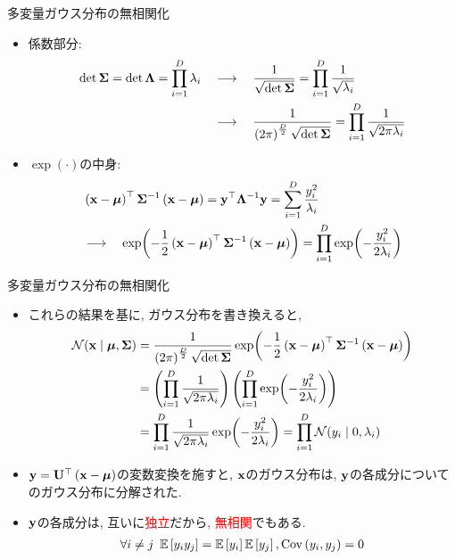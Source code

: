 \documentclass[dvipdfmx,notheorems,t]{beamer}
\begin{document}
\begin{frame}{多変量ガウス分布の無相関化}
\begin{itemize}
  \item 係数部分:
  \begin{align*}
    \det \vb{\Sigma} = \det \vb{\Lambda} = \prod_{i = 1}^D \lambda_i \quad &\longrightarrow \quad
      \frac{1}{\sqrt{\det \vb{\Sigma}}} = \prod_{i = 1}^D \frac{1}{\sqrt{\lambda_i}} \\
      &\longrightarrow \quad
      \frac{1}{\left( 2\pi \right)^\frac{D}{2} \sqrt{\det \vb{\Sigma}}}
      = \prod_{i = 1}^D \frac{1}{\sqrt{2\pi \lambda_i}}
  \end{align*}
  \item $\exp(\cdot)$の中身:
  \begin{align*}
    & \left( \vb{x} - \vb*{\mu} \right)^\top \vb{\Sigma}^{-1}
      \left( \vb{x} - \vb*{\mu} \right)
      = \vb{y}^\top \vb{\Lambda}^{-1} \vb{y}
      = \sum_{i = 1}^D \frac{y_i^2}{\lambda_i} \\
    & \longrightarrow \quad
    \exp(-\frac{1}{2} \left( \vb{x} - \vb*{\mu} \right)^\top \vb{\Sigma}^{-1}
      \left( \vb{x} - \vb*{\mu} \right))
      = \prod_{i = 1}^D \exp(-\frac{y_i^2}{2 \lambda_i})
  \end{align*}
\end{itemize}
\end{frame}

\begin{frame}{多変量ガウス分布の無相関化}
\begin{itemize}
  \item これらの結果を基に, ガウス分布を書き換えると,
  \begin{align*}
    \mathcal{N}(\vb{x} \mid \vb*{\mu}, \vb{\Sigma})
      &= \frac{1}{\left( 2\pi \right)^\frac{D}{2} \sqrt{\det \vb{\Sigma}}}
        \exp(-\frac{1}{2} \left( \vb{x} - \vb*{\mu} \right)^\top \vb{\Sigma}^{-1}
        \left( \vb{x} - \vb*{\mu} \right)) \\
      &= \left( \prod_{i = 1}^D \frac{1}{\sqrt{2\pi \lambda_i}} \right)
        \left( \prod_{i = 1}^D \exp(-\frac{y_i^2}{2 \lambda_i}) \right) \\
      &= \prod_{i = 1}^D \frac{1}{\sqrt{2\pi \lambda_i}} \exp(-\frac{y_i^2}{2 \lambda_i})
      = \prod_{i = 1}^D \mathcal{N}(y_i \mid 0, \lambda_i)
  \end{align*}
  \item $\vb{y} = \vb{U}^\top \left( \vb{x} - \vb*{\mu} \right)$の変数変換を施すと,
  $\vb{x}$のガウス分布は, $\vb{y}$の各成分についてのガウス分布に分解された.
  \item $\vb{y}$の各成分は, 互いに\textcolor{red}{独立}だから, \textcolor{red}{無相関}でもある.
  \begin{gather*}
    \forall i \neq j \ \operatorname{\mathbb{E}} \left[ y_i y_j \right] = \operatorname{\mathbb{E}} \left[ y_i \right] \operatorname{\mathbb{E}} \left[ y_j \right], \operatorname{Cov} \left( y_i, y_j \right) = 0
  \end{gather*}
\end{itemize}
\end{frame}
\end{document}
